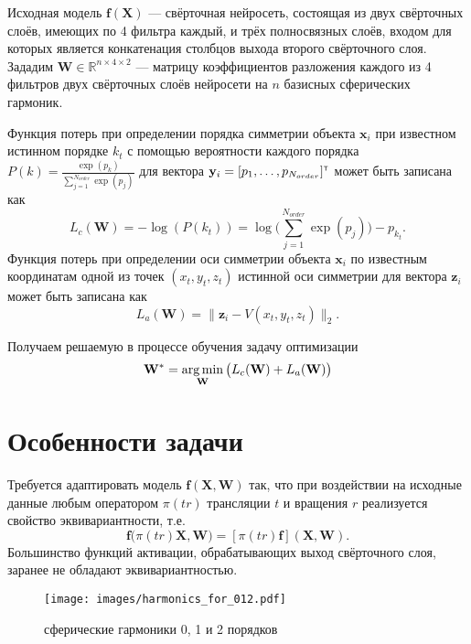\documentclass[12pt,twosides]{article}
\begin{document}
	Исходная модель $\mathbf{f(X)}$ --- свёрточная нейросеть, состоящая из двух свёрточных слоёв, имеющих по 4 фильтра каждый, и трёх полносвязных слоёв, входом для которых является конкатенация столбцов выхода второго свёрточного слоя. Зададим $\mathbf{W}\in\mathbb{R}^{n\times4\times2}$ --- матрицу коэффициентов разложения каждого из 4 фильтров двух свёрточных слоёв нейросети на $n$ базисных сферических гармоник.
	
	Функция потерь при определении порядка симметрии объекта $\mathbf{x}_i$ при известном истинном порядке $k_{t}$ с помощью вероятности каждого порядка   $P(k)=\frac{\exp(p_k)}{\sum_{j=1}^{N_{order}}\exp(p_j)}$ для вектора $\mathbf{y}_i=[p_1,\dots,p_{N_{order}}]^{\text{\tiny\sffamily\upshape\mdseries T}}$ может быть записана как
	$$L_c(\mathbf{W})=-\log(P(k_{t}))=\log\Bigg(\sum_{j=1}^{N_{order}}\exp(p_j)\Bigg)-p_{k_{t}}.$$
	Функция потерь при определении оси симметрии объекта $\mathbf{x}_i$ по известным координатам одной из точек $(x_{t},y_{t},z_{t})$ истинной оси симметрии для вектора $\mathbf{z}_i$ может быть записана как
	$$L_a(\mathbf{W})=\|\mathbf{z}_i-V(x_{t},y_{t},z_{t})\|_2.$$
	
	Получаем решаемую в процессе обучения задачу оптимизации
	$$\mathbf{W}^*=\argmin_{\textbf{W}}\big(L_c(\mathbf{W})+L_a(\mathbf{W})\big)$$
	
	\section{Особенности задачи}
	
	Требуется адаптировать модель $\mathbf{f(X, W)}$ так, что при воздействии на исходные данные любым оператором $\pi(tr)$ трансляции $t$ и вращения $r$ реализуется свойство эквивариантности, т.е.
	$$\mathbf{f}(\pi(tr)\mathbf{X,W)}=[\pi(tr)\mathbf{f}]\mathbf{(X,W)}.$$ Большинство функций активации, обрабатывающих выход свёрточного слоя, заранее не обладают эквивариантностью.
	
	\begin{figure}[h!]
		\centering
		\texttt{[image: images/harmonics\_for\_012.pdf]}
		\caption{сферические гармоники 0, 1 и 2 порядков}
	\end{figure}
	
\end{document}
